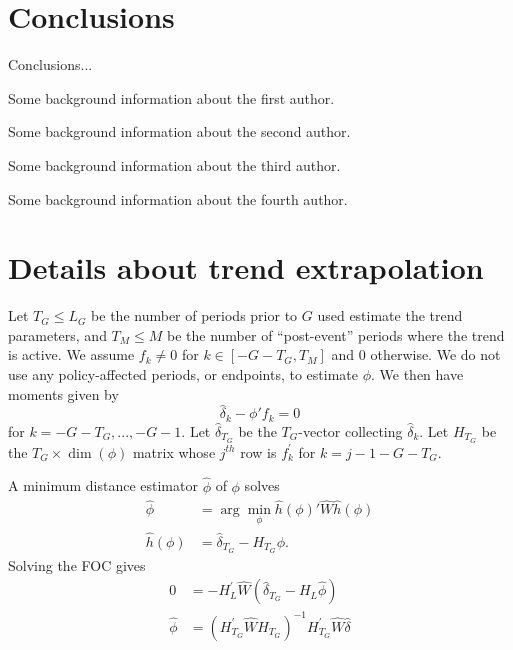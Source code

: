 \documentclass[bib]{./sty/statapress}
\begin{document}
\section{Conclusions}
Conclusions...

%
%




\begin{aboutauthors}
Some background information about the first author.

Some background information about the second author.

Some background information about the third author.

Some background information about the fourth author.
\end{aboutauthors}


\clearpage

\appendix

\section{Details about trend extrapolation}
\label{sec:app_trend}
Let $T_G \leq L_G$ be the number of periods prior to $G$ used estimate the trend parameters, and $T_M \leq M$ be the number of ``post-event'' periods where the trend is active.
We assume $f_k \neq 0$ for $k \in \left[-G-T_G,T_M \right]$ and $0$ otherwise.
We do not use any policy-affected periods, or endpoints, to estimate $\phi$.
We then have moments given by
\[
\widehat{\delta}_{k}-\phi'f_{k}=0
\]
for $k=-G-T_G,...,-G-1$. Let $\widehat{\delta}_{T_G}$ be the $T_{G}$-vector
collecting $\widehat{\delta}_{k}$. Let $H_{T_G}$ be the $T_{G}\times\dim\left(\phi\right)$
matrix whose $j^{th}$ row is $f_{k}^{'}$ for $k=j-1-G-T_{G}$.

A minimum distance estimator $\hat{\phi}$ of $\phi$ solves
\begin{align*}
\hat{\phi} & =\arg\min_{\phi}\hat{h}\left(\phi\right)'\hat{W}\hat{h}\left(\phi\right)\\
\hat{h}\left(\phi\right) & =\widehat{\delta}_{T_G}-H_{T_G}\phi.
\end{align*}
Solving the FOC gives
\[
\begin{array}{rl}
0 & =-H_{L}^{\prime}\widehat{W}(\widehat{\delta}_{T_G}-H_{L}\widehat{\phi})\\
\widehat{\phi} & =(H_{T_G}^{\prime}\widehat{W}H_{T_G})^{-1}H_{T_G}^{\prime}\widehat{W}\widehat{\delta}
\end{array}
\]
\end{document}
